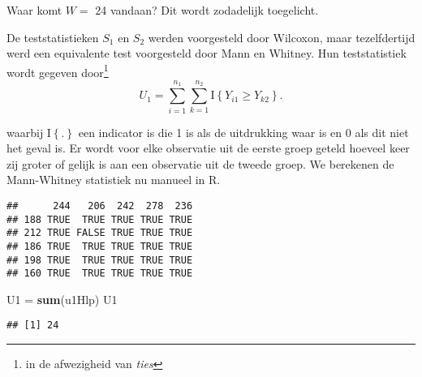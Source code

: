 \documentclass[12pt,dutch,coursenotes]{book}
\newenvironment{Shaded}{\begin{snugshade}}{\end{snugshade}}
\newcommand{\KeywordTok}[1]{\textcolor[rgb]{0.13,0.29,0.53}{\textbf{#1}}}
\newcommand{\DataTypeTok}[1]{\textcolor[rgb]{0.13,0.29,0.53}{#1}}
\newcommand{\DecValTok}[1]{\textcolor[rgb]{0.00,0.00,0.81}{#1}}
\newcommand{\StringTok}[1]{\textcolor[rgb]{0.31,0.60,0.02}{#1}}
\newcommand{\ControlFlowTok}[1]{\textcolor[rgb]{0.13,0.29,0.53}{\textbf{#1}}}
\newcommand{\OperatorTok}[1]{\textcolor[rgb]{0.81,0.36,0.00}{\textbf{#1}}}
\newcommand{\NormalTok}[1]{#1}
\let\rmarkdownfootnote\footnote%
\def\footnote{\protect\rmarkdownfootnote}
\theoremstyle{definition}
\theoremstyle{definition}
\theoremstyle{definition}
\theoremstyle{remark}
\begin{document}
Waar komt \(W=\) 24 vandaan? Dit wordt zodadelijk toegelicht.

De teststatistieken \(S_1\) en \(S_2\) werden voorgesteld door Wilcoxon,
maar tezelfdertijd werd een equivalente test voorgesteld door Mann en
Whitney. Hun teststatistiek wordt gegeven door\footnote{in de
  afwezigheid van \emph{ties}} \[
 U_1 = \sum_{i=1}^{n_1}\sum_{k=1}^{n_2} \text{I}\left\{Y_{i1}\geq Y_{k2}\right\}.
\]

waarbij \(\text{I}\left\{.\right\}\) een indicator is die 1 is als de
uitdrukking waar is en 0 als dit niet het geval is. Er wordt voor elke
observatie uit de eerste groep geteld hoeveel keer zij groter of gelijk
is aan een observatie uit de tweede groep. We berekenen de Mann-Whitney
statistiek nu manueel in R.

\begin{Shaded}
\end{Shaded}

\begin{verbatim}
##      244   206  242  278  236
## 188 TRUE  TRUE TRUE TRUE TRUE
## 212 TRUE FALSE TRUE TRUE TRUE
## 186 TRUE  TRUE TRUE TRUE TRUE
## 198 TRUE  TRUE TRUE TRUE TRUE
## 160 TRUE  TRUE TRUE TRUE TRUE
\end{verbatim}

\begin{Shaded}
\begin{Highlighting}[]
\NormalTok{U1 =}\StringTok{ }\KeywordTok{sum}\NormalTok{(u1Hlp)}
\NormalTok{U1}
\end{Highlighting}
\end{Shaded}

\begin{verbatim}
## [1] 24
\end{verbatim}
\end{document}
